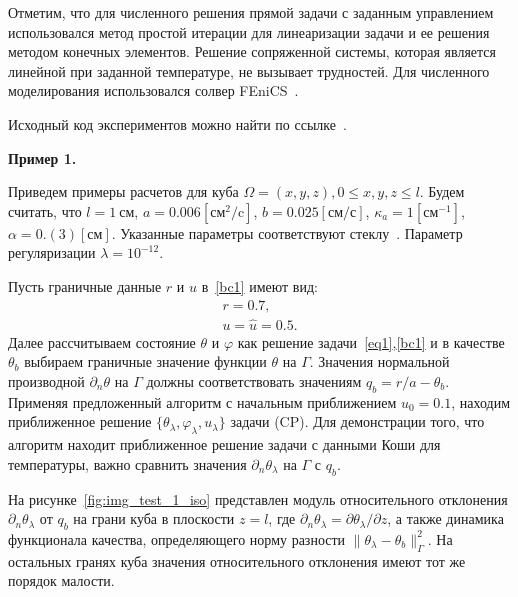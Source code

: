 \documentclass[12pt]{article}
\begin{document}
    Отметим, что для численного решения прямой задачи с заданным управлением использовался
    метод простой итерации для линеаризации задачи и ее решения методом конечных элементов.
    Решение сопряженной системы, которая является линейной при заданной температуре, не вызывает трудностей.
    Для численного моделирования использовался солвер FEniCS~\cite{fenics, dolfin}.

    Исходный код экспериментов можно найти по ссылке~\cite{mesenev-github}.

    \textbf{Пример 1.}

    Приведем примеры расчетов для куба $\Omega = {(x, y, z), 0 \leq x,y,z \leq l}$.
    Будем считать, что $l=1~\text{см}$, $a = 0.006[\text{см}^2/\text{c}]$,
    $b=0.025[\text{см}/\text{с}]$, $\kappa_a=1[\text{см}^{-1}]$, $\alpha = 0.(3)[\text{см}]$.
    Указанные параметры соответствуют стеклу~\cite{Grenkin5}.
    Параметр регуляризации $\lambda=10^{-12}.$

    Пусть граничные данные $r$ и $u$ в~\eqref{bc1} имеют вид:
    \begin{gather*}
        r = 0.7,\\
        u = \hat u = 0.5.
    \end{gather*}
    Далее рассчитываем состояние $\theta$ и $\varphi$ как решение
    задачи~\eqref{eq1},\eqref{bc1} и в качестве $\theta_b$ выбираем
    граничные значение функции $\theta$ на $\Gamma$.
    Значения нормальной производной $\partial_n\theta$ на $\Gamma$
    должны соответствовать значениям $q_b=r/a-\theta_b$.
    Применяя предложенный алгоритм с начальным приближением $u_0 = 0.1$, находим приближенное решение
    $\{\theta_\lambda, \varphi_\lambda, u_\lambda\}$ задачи (CP).
    Для демонстрации того, что алгоритм находит приближенное решение задачи с данными
    Коши для температуры, важно сравнить значения $\partial_n\theta_\lambda$ на $\Gamma$ с $q_b.$

    На рисунке~\ref{fig:img_test_1_iso} представлен модуль относительного
    отклонения $\partial_n\theta_\lambda$ от $q_b$ на грани куба в плоскости $z=l$,
    где $\partial_n\theta_\lambda=\partial\theta_\lambda/\partial z$,
    а также динамика функционала качества, определяющего норму
    разности $\|\theta_\lambda -\theta_b\|^2_\Gamma$.
    На остальных гранях куба значения относительного отклонения имеют тот же порядок малости.
\end{document}
